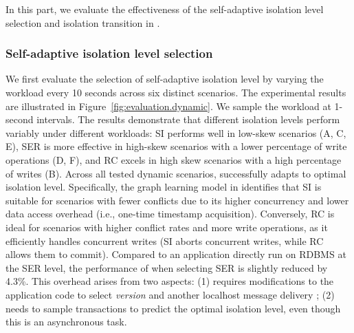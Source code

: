 
In this part, we evaluate the effectiveness of the self-adaptive isolation level selection and isolation transition in \sysname.

\subsubsection{Self-adaptive isolation level selection}
We first evaluate the selection of self-adaptive isolation level by varying the workload every 10 seconds across six distinct scenarios. The experimental results are illustrated in Figure~\ref{fig:evaluation.dynamic}. %
We sample the workload at 1-second intervals. 
The results demonstrate that different isolation levels perform variably under different workloads: SI performs well in low-skew scenarios (A, C, E), SER is more effective in high-skew scenarios with a lower percentage of write operations (D, F), and RC excels in high skew scenarios with a high percentage of writes (B). Across all tested dynamic scenarios, \sysname successfully adapts to optimal isolation level. Specifically, the graph learning model in \sysname identifies that SI is suitable for scenarios with fewer conflicts due to its higher concurrency and lower data access overhead (i.e., one-time timestamp acquisition). Conversely, RC is ideal for scenarios with higher conflict rates and more write operations, as it efficiently handles concurrent writes (SI aborts concurrent writes, while RC allows them to commit). Compared to an application directly run on RDBMS at the SER level, the performance of \sysname when selecting SER is slightly reduced by 4.3\%. This overhead arises from two aspects: (1) \sysname requires modifications to the application code to select \textit{version} and another localhost message delivery ; (2) \sysname needs to sample transactions to predict the optimal isolation level, even though this is an asynchronous task.

